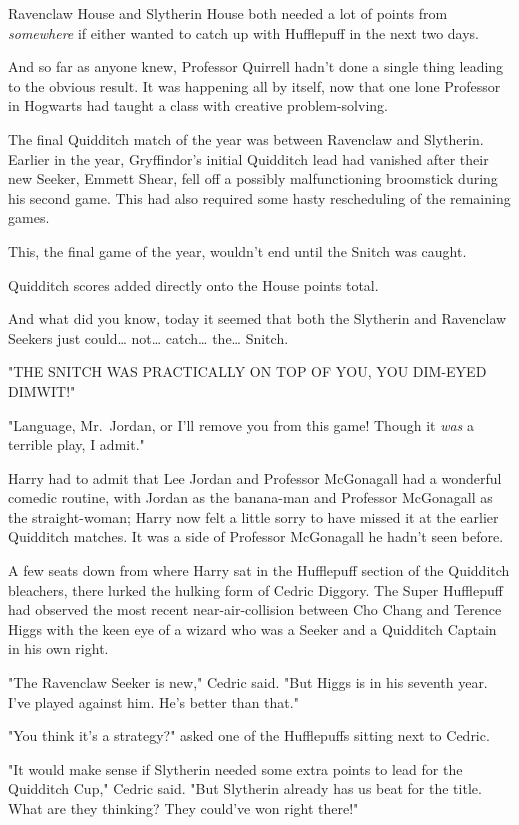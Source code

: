 Ravenclaw House and Slytherin House both needed a lot of points from 
\emph{somewhere} if either wanted to catch up with Hufflepuff in the next two 
days.

And so far as anyone knew, Professor Quirrell hadn't done a single thing 
leading to the obvious result. It was happening all by itself, now that one 
lone Professor in Hogwarts had taught a class with creative problem-solving.

The final Quidditch match of the year was between Ravenclaw and Slytherin. 
Earlier in the year, Gryffindor's initial Quidditch lead had vanished after 
their new Seeker, Emmett Shear, fell off a possibly malfunctioning broomstick 
during his second game. This had also required some hasty rescheduling of the 
remaining games.

This, the final game of the year, wouldn't end until the Snitch was caught.

Quidditch scores added directly onto the House points total.

And what did you know, today it seemed that both the Slytherin and Ravenclaw 
Seekers just could{\ldots} not{\ldots} catch{\ldots} the{\ldots} Snitch.

"THE SNITCH WAS PRACTICALLY ON TOP OF YOU, YOU DIM-EYED DIMWIT!"

"Language, Mr.~Jordan, or I'll remove you from this game! Though it \emph{was} 
a terrible play, I admit."

Harry had to admit that Lee Jordan and Professor McGonagall had a wonderful 
comedic routine, with Jordan as the banana-man and Professor McGonagall as the 
straight-woman; Harry now felt a little sorry to have missed it at the earlier 
Quidditch matches. It was a side of Professor McGonagall he hadn't seen before.

A few seats down from where Harry sat in the Hufflepuff section of the 
Quidditch bleachers, there lurked the hulking form of Cedric Diggory. The Super 
Hufflepuff had observed the most recent near-air-collision between Cho Chang 
and Terence Higgs with the keen eye of a wizard who was a Seeker and a 
Quidditch Captain in his own right.

"The Ravenclaw Seeker is new," Cedric said. "But Higgs is in his seventh year. 
I've played against him. He's better than that."

"You think it's a strategy?" asked one of the Hufflepuffs sitting next to 
Cedric.

"It would make sense if Slytherin needed some extra points to lead for the 
Quidditch Cup," Cedric said. "But Slytherin already has us beat for the title. 
What are they thinking? They could've won right there!"

